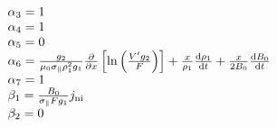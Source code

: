 \begin{equation}
\begin{array}{l}
{\alpha _3} = 1\\
{\alpha _4} = 1\\
{\alpha _5} = 0\\
{\alpha _6} = \frac{{{g_2}}}{{{\mu _0}{\sigma _\parallel }\rho _{\rm{1}}^2{g_1}}}\frac{\partial }{{\partial x}}\left[ {\ln \left( {\frac{{V'{g_2}}}{F}} \right)} \right] + \frac{x}{{{\rho _1}}}\frac{{{\rm{d}}{\rho _1}}}{{{\rm{d}}t}} + \frac{x}{{2{B_0}}}\frac{{{\rm{d}}{B_0}}}{{{\rm{d}}t}}\\
{\alpha _7} = 1\\
{\beta _1} = \frac{{{B_0}}}{{{\sigma _\parallel }F{g_1}}}{j_{{\rm{ni}}}}\\
{\beta _2} = 0
\end{array}
\end{equation}

